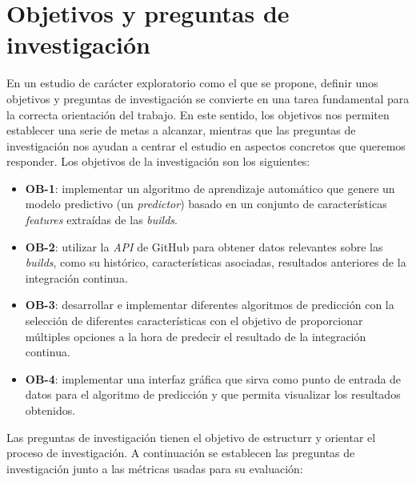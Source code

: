 \section{Objetivos y preguntas de investigación}
En un estudio de carácter exploratorio como el que se propone, definir unos objetivos y preguntas
de investigación se convierte en una tarea fundamental para la correcta orientación del trabajo.
En este sentido, los objetivos nos permiten establecer una serie de metas a alcanzar, mientras
que las preguntas de investigación nos ayudan a centrar el estudio en aspectos concretos que
queremos responder. Los objetivos de la investigación son los siguientes:

\begin{itemize}
    \item \textbf{OB-1}: implementar un algoritmo de aprendizaje automático que genere un modelo
          predictivo (un \textit{predictor}) basado en un conjunto de características
          \textit{features} extraídas de las \textit{builds}.\\
    \item \textbf{OB-2}: utilizar la \textit{API} de GitHub para obtener datos relevantes sobre
          las \textit{builds}, como su histórico, características asociadas, resultados anteriores
          de la integración continua.\\
    \item \textbf{OB-3}: desarrollar e implementar diferentes algoritmos de predicción con la
          selección de diferentes características con el objetivo de proporcionar múltiples
          opciones a la hora de predecir el resultado de la integración continua.\\
    \item \textbf{OB-4}: implementar una interfaz gráfica que sirva como punto de entrada de
          datos para el algoritmo de predicción y que permita visualizar los resultados
          obtenidos.
\end{itemize}

Las preguntas de investigación tienen el objetivo de estructurr y orientar el proceso de
investigación. A continuación se establecen las preguntas de investigación junto a las
métricas usadas para su evaluación:


